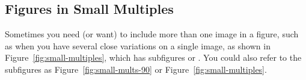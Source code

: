 \documentclass[thesis]{hmcposter}
\begin{document}
\begin{poster}
\subsection{Figures in Small Multiples}

Sometimes you need (or want) to include more than one image in a
figure, such as when you have several close variations on a single
image, as shown in Figure~\ref{fig:small-multiples}, which has
subfigures  or
.  You could also refer to the subfigures
as Figure~\ref{fig:small-mults-90} or
Figure~\ref{fig:small-multiples}.

\begin{figure}
  \centering
        \qquad\qquad
\end{figure}
\end{poster}
\end{document}
